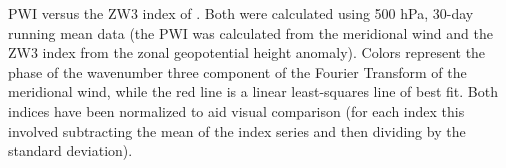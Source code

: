 \label{fig:metric_vs_zw3}
PWI versus the ZW3 index of \citet{Raphael2004}. Both were calculated using 500 hPa, 30-day running mean data (the PWI was calculated from the meridional wind and the ZW3 index from the zonal geopotential height anomaly). Colors represent the phase of the wavenumber three component of the Fourier Transform of the meridional wind, while the red line is a linear least-squares line of best fit. Both indices have been normalized to aid visual comparison (for each index this involved subtracting the mean of the index series and then dividing by the standard deviation).